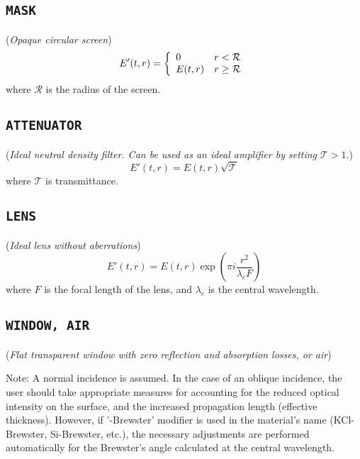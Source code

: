 \documentclass{report}
\begin{document}
\subsection*{\texttt{MASK}}
(\textit{Opaque circular screen})
\begin{equation}
E'(t,r) = \left\{ \begin{array}{ll}
  0         & r < \mathcal{R}\\
  E(t,r) & r \geq \mathcal{R}\end{array}\right.\\ 
\end{equation}
where $\mathcal{R}$ is the radius of the screen.

\subsection*{\texttt{ATTENUATOR}}
(\textit{Ideal neutral density filter. Can be used as an ideal amplifier by setting $\mathcal{T}>1$}.)
\begin{equation}
E'(t,r) = E(t,r) \sqrt{\mathcal{T}}
\end{equation}
where $\mathcal{T}$ is transmittance.

\subsection*{\texttt{LENS}}
(\textit{Ideal lens without aberrations})
\begin{equation}
E'(t,r) = E(t,r) \exp\left( \pi i \frac{r^2}{\lambda_c F} \right)
\end{equation}
where $F$ is the focal length of the lens, and $\lambda_c$ is the central wavelength.

\subsection*{\texttt{WINDOW, AIR}}
(\textit{Flat transparent window with zero reflection and absorption losses, or air})

Note: A normal incidence is assumed. In the case of an oblique incidence, the user should take appropriate measures for accounting for the reduced optical intensity on the surface, and the increased propagation length (effective thickness). However, if '-Brewster' modifier is used in the material's name (KCl-Brewster, Si-Brewster, etc.), the necessary adjustments are performed automatically for the Brewster's angle calculated at the central wavelength.
\end{document}

